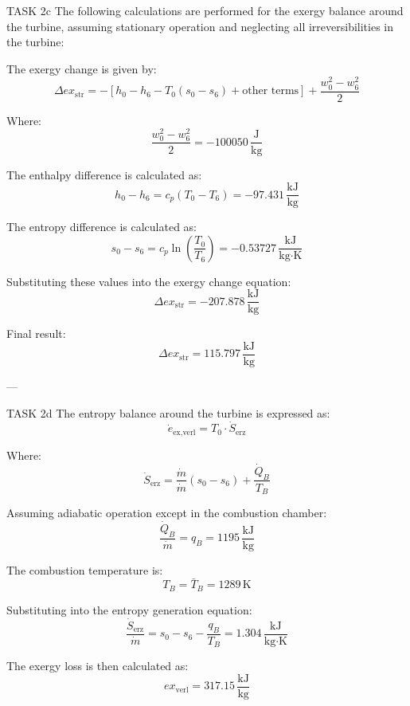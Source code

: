 TASK 2c  
The following calculations are performed for the exergy balance around the turbine, assuming stationary operation and neglecting all irreversibilities in the turbine:  

The exergy change is given by:  
\[
\Delta ex_{\text{str}} = -\left[ h_0 - h_6 - T_0 \left( s_0 - s_6 \right) + \text{other terms} \right] + \frac{w_0^2 - w_6^2}{2}
\]  

Where:  
\[
\frac{w_0^2 - w_6^2}{2} = -100050 \, \frac{\text{J}}{\text{kg}}
\]  

The enthalpy difference is calculated as:  
\[
h_0 - h_6 = c_p \left( T_0 - T_6 \right) = -97.431 \, \frac{\text{kJ}}{\text{kg}}
\]  

The entropy difference is calculated as:  
\[
s_0 - s_6 = c_p \ln \left( \frac{T_0}{T_6} \right) = -0.53727 \, \frac{\text{kJ}}{\text{kg·K}}
\]  

Substituting these values into the exergy change equation:  
\[
\Delta ex_{\text{str}} = -207.878 \, \frac{\text{kJ}}{\text{kg}}
\]  

Final result:  
\[
\Delta ex_{\text{str}} = 115.797 \, \frac{\text{kJ}}{\text{kg}}
\]  

---

TASK 2d  
The entropy balance around the turbine is expressed as:  
\[
\dot{e}_{\text{ex,verl}} = T_0 \cdot \dot{S}_{\text{erz}}
\]  

Where:  
\[
\dot{S}_{\text{erz}} = \frac{\dot{m}}{\dot{m}} \left( s_0 - s_6 \right) + \frac{\dot{Q}_B}{T_B}
\]  

Assuming adiabatic operation except in the combustion chamber:  
\[
\frac{\dot{Q}_B}{\dot{m}} = q_B = 1195 \, \frac{\text{kJ}}{\text{kg}}
\]  

The combustion temperature is:  
\[
T_B = \bar{T}_B = 1289 \, \text{K}
\]  

Substituting into the entropy generation equation:  
\[
\frac{\dot{S}_{\text{erz}}}{\dot{m}} = s_0 - s_6 - \frac{q_B}{T_B} = 1.304 \, \frac{\text{kJ}}{\text{kg·K}}
\]  

The exergy loss is then calculated as:  
\[
ex_{\text{verl}} = 317.15 \, \frac{\text{kJ}}{\text{kg}}
\]  